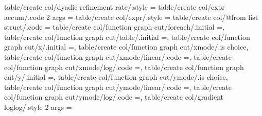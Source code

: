 {{{{{{{{table/create col/dyadic refinement rate/.style                     ={                                                                                                                                 
table/create col/expr accum/.code 2 args                           ={                                                                                                                                 
table/create col/expr/.style                                       ={                                                                                                                                 
table/create col/@from list struct/.code                           ={                                                                                                                                 
table/create col/function graph cut/foreach/.initial               =,                                                                                                                                  
table/create col/function graph cut/table/.initial                 =,                                                                                                                                  
table/create col/function graph cut/x/.initial                     =,                                                                                                                                  
table/create col/function graph cut/xmode/.is choice,
table/create col/function graph cut/xmode/linear/.code             ={\def\pgfplotstable@fgc@xmode{0}},                                                                                                
table/create col/function graph cut/xmode/log/.code                ={\def\pgfplotstable@fgc@xmode{1}},                                                                                                
table/create col/function graph cut/y/.initial                     =,                                                                                                                                  
table/create col/function graph cut/ymode/.is choice,
table/create col/function graph cut/ymode/linear/.code             ={\def\pgfplotstable@fgc@ymode{0}},                                                                                                
table/create col/function graph cut/ymode/log/.code                ={\def\pgfplotstable@fgc@ymode{1}},                                                                                                
table/create col/gradient loglog/.style 2 args                     ={                                                                                                                                 
}}}}}}}}}}}}}
